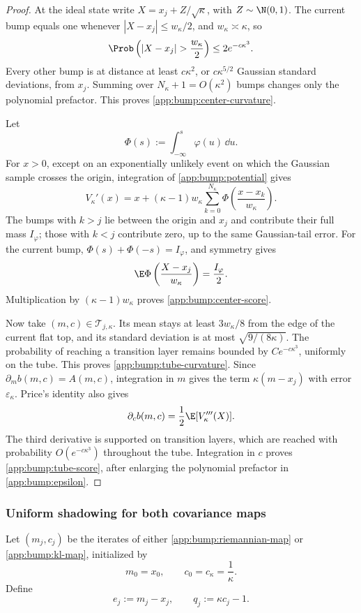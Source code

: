 \begin{proof}
At the ideal state write \(X=x_j+Z/\sqrt\kappa\), with
\(Z\sim\N(0,1)\).  The current bump equals one whenever
\(|X-x_j|\leq w_\kappa/2\), and \(w_\kappa\asymp\kappa\), so
\[
    \Prob\left(|X-x_j|>\frac{w_\kappa}{2}\right)
    \leq2e^{-c\kappa^3}.
\]
Every other bump is at distance at least \(c\kappa^2\), or
\(c\kappa^{5/2}\) Gaussian standard deviations, from \(x_j\).
Summing over \(N_\kappa+1=O(\kappa^2)\) bumps changes only the
polynomial prefactor.  This proves
\eqref{app:bump:center-curvature}.

Let
\[
    \Phi(s):=\int_{-\infty}^s\varphi(u)\,\dd u.
\]
For \(x>0\), except on an exponentially unlikely event on which the
Gaussian sample crosses the origin, integration of
\eqref{app:bump:potential} gives
\[
    V_\kappa'(x)
    =x+(\kappa-1)w_\kappa
      \sum_{k=0}^{N_\kappa}
      \Phi\left(\frac{x-x_k}{w_\kappa}\right).
\]
The bumps with \(k>j\) lie between the origin and \(x_j\) and contribute
their full mass \(I_\varphi\); those with \(k<j\) contribute zero, up to
the same Gaussian-tail error.  For the current bump,
\(\Phi(s)+\Phi(-s)=I_\varphi\), and symmetry gives
\[
    \E\Phi\left(\frac{X-x_j}{w_\kappa}\right)
    =\frac{I_\varphi}{2}.
\]
Multiplication by \((\kappa-1)w_\kappa\) proves
\eqref{app:bump:center-score}.

Now take \((m,c)\in\mathcal T_{j,\kappa}\).  Its mean stays at least
\(3w_\kappa/8\) from the edge of the current flat top, and its standard
deviation is at most \(\sqrt{9/(8\kappa)}\).  The probability of
reaching a transition layer remains bounded by \(Ce^{-c\kappa^3}\),
uniformly on the tube.  This proves
\eqref{app:bump:tube-curvature}.  Since
\(\partial_m b(m,c)=A(m,c)\), integration in \(m\) gives the term
\(\kappa(m-x_j)\) with error \(\varepsilon_\kappa\).  Price's identity
also gives
\[
    \partial_c b(m,c)=\frac12\E[V_\kappa'''(X)].
\]
The third derivative is supported on transition layers, which are
reached with probability \(O(e^{-c\kappa^3})\) throughout the tube.
Integration in \(c\) proves \eqref{app:bump:tube-score}, after enlarging
the polynomial prefactor in \eqref{app:bump:epsilon}.
\end{proof}

\subsubsection{Uniform shadowing for both covariance maps}

Let \((m_j,c_j)\) be the iterates of either
\eqref{app:bump:riemannian-map} or \eqref{app:bump:kl-map}, initialized
by
\begin{equation}
\label{app:bump:initial-state}
    m_0=x_0,
    \qquad
    c_0=c_\kappa=\frac1\kappa.
\end{equation}
Define
\begin{equation}
\label{app:bump:shadow-errors}
    e_j:=m_j-x_j,
    \qquad
    q_j:=\kappa c_j-1.
\end{equation}

